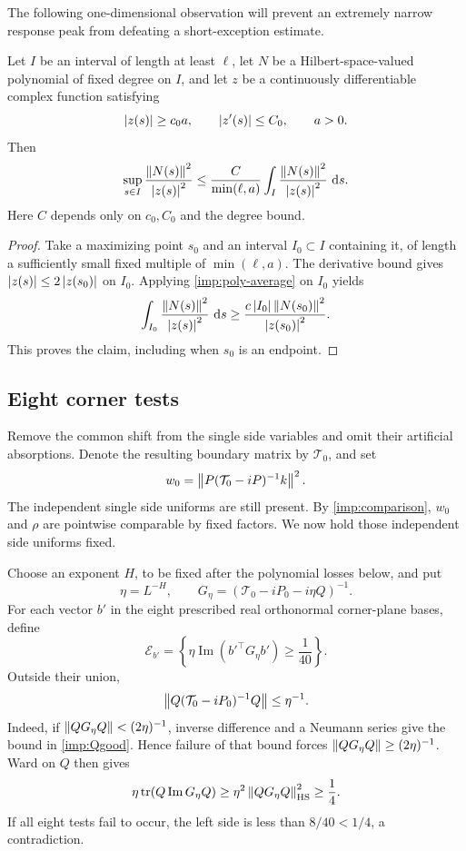 The following one-dimensional observation will prevent an extremely
narrow response peak from defeating a short-exception estimate.

\begin{lemma}
\label{imp:resolution}
Let $I$ be an interval of length at least $\ell$, let $N$ be a
Hilbert-space-valued polynomial of fixed degree on $I$, and let $z$ be a
continuously differentiable complex function satisfying
\[
 \left\lvert z(s)\right\rvert\ge c_0 a,
 \qquad \left\lvert z'(s)\right\rvert\le C_0,
 \qquad a>0.
\]
Then
\[
 \sup_{s\in I}\frac{\left\lVert N(s)\right\rVert^2}{\left\lvert z(s)\right\rvert^2}
 \le \frac{C}{\min(\ell,a)}
       \int_I\frac{\left\lVert N(s)\right\rVert^2}{\left\lvert z(s)\right\rvert^2}\,\,\mathrm d s.
\]
Here $C$ depends only on $c_0,C_0$ and the degree bound.
\end{lemma}

\begin{proof}
Take a maximizing point $s_0$ and an interval $I_0\subset I$ containing it,
of length a sufficiently small fixed multiple of $\min(\ell,a)$.
The derivative bound gives $\left\lvert z(s)\right\rvert\le2\left\lvert z(s_0)\right\rvert$ on $I_0$.
Applying \cref{imp:poly-average} on $I_0$ yields
\[
 \int_{I_0}\frac{\left\lVert N(s)\right\rVert^2}{\left\lvert z(s)\right\rvert^2}\,\,\mathrm d s
 \ge \frac{c\left\lvert I_0\right\rvert\left\lVert N(s_0)\right\rVert^2}{\left\lvert z(s_0)\right\rvert^2}.
\]
This proves the claim, including when $s_0$ is an endpoint.
\end{proof}

\subsection{Eight corner tests}

Remove the common shift from the single side variables and omit their
artificial absorptions. Denote the resulting boundary matrix by
$\mathcal T_0$, and set
\[
 w_0=\left\lVert P(\mathcal T_0-iP)^{-1}k\right\rVert^2.
\]
The independent single side uniforms are still present. By
\cref{imp:comparison}, $w_0$ and $\rho$ are pointwise comparable by
fixed factors. We now hold those independent side uniforms fixed.

Choose an exponent $H$, to be fixed after the polynomial losses below,
and put
\[
 \eta=L^{-H},
 \qquad G_\eta=(\mathcal T_0-iP_0-i\eta Q)^{-1}.
\]
For each vector $b'$ in the eight prescribed real orthonormal corner-plane
bases, define
\begin{equation}
 \mathcal E_{b'}=
 \left\{\eta\operatorname{Im}(b'^\top G_\eta b')\ge\frac1{40}\right\}.
 \label{imp:test}
\end{equation}
Outside their union,
\begin{equation}
 \left\lVert Q(\mathcal T_0-iP_0)^{-1}Q\right\rVert\le\eta^{-1}.
 \label{imp:Qgood}
\end{equation}
Indeed, if $\left\lVert QG_\eta Q\right\rVert<(2\eta)^{-1}$, inverse difference and a
Neumann series give the bound in \cref{imp:Qgood}. Hence failure of that
bound forces $\left\lVert QG_\eta Q\right\rVert\ge(2\eta)^{-1}$. Ward on $Q$ then gives
\[
 \eta\operatorname{tr}(Q\operatorname{Im}G_\eta Q)
 \ge \eta^2\left\lVert QG_\eta Q\right\rVert_{\mathrm{HS}}^2\ge\frac14.
\]
If all eight tests fail to occur, the left side is less than $8/40<1/4$,
a contradiction.

